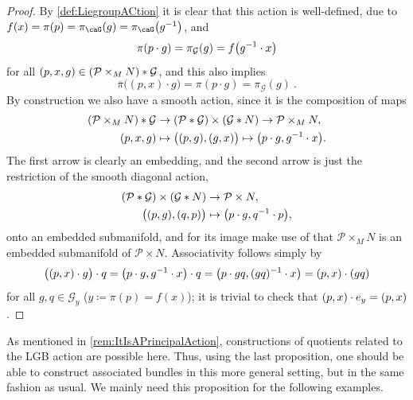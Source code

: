 \documentclass[reqno,a4paper,oneside]{amsart}
\theoremstyle{plain}
\theoremstyle{remark}
\theoremstyle{definition}
\begin{document}
\begin{proof}
\leavevmode\newline
By \ref{def:LiegroupACtion} it is clear that this action is well-defined, due to $f(x)= \pi(p) = \pi_\caG(g) = \pi_\caG\mleft(g^{-1}\mright)$, and
\begin{equation*}
\pi(p\cdot g) = \pi_{\mathcal{G}}(g) = f\mleft( g^{-1} \cdot x \mright)
\end{equation*}
for all $(p,x,g) \in \mleft(\mathcal{P} \times_M N\mright) * \mathcal{G}$,
and this also implies
\begin{equation*}
\overline{\pi}\bigl( (p, x) \cdot g \bigr)
=
\pi(p\cdot g)
=
\pi_{\mathcal{G}}(g)~.
\end{equation*}
By construction we also have a smooth action, since it is the composition of maps
\begin{align*}
\mleft(\mathcal{P} \times_M N\mright) * \mathcal{G} &\to (\mathcal{P} * \mathcal{G}) \times (\mathcal{G} * N) \to \mathcal{P} \times_M N,\\
(p, x, g) &\mapsto \bigl( (p, g), (g, x) \bigr) \mapsto \mleft( p \cdot g, g^{-1} \cdot x \mright).
\end{align*}
The first arrow is clearly an embedding, and the second arrow is just the restriction of the smooth diagonal action,
\begin{align*}
(\mathcal{P} * \mathcal{G}) \times (\mathcal{G} * N) &\to \mathcal{P} \times N,\\
\bigl( (p, g), (q, p) \bigr) &\mapsto \mleft( p \cdot g, q^{-1} \cdot p \mright),
\end{align*}
onto an embedded submanifold, and for its image make use of that $\mathcal{P} \times_M N$ is an embedded submanifold of $\mathcal{P} \times N$. Associativity follows simply by
\begin{equation*}
\bigl((p, x) \cdot g \bigr) \cdot q
=
\mleft( p \cdot g, g^{-1} \cdot x \mright) \cdot q
=
\mleft( p \cdot gq, (gq)^{-1} \cdot x \mright)
=
\mleft( p, x \mright) \cdot (gq)
\end{equation*}
for all $g, q \in \mathcal{G}_y$ ($y \coloneqq \pi(p) = f(x)$); it is trivial to check that $\mleft( p, x \mright) \cdot e_y = (p, x)$.
\end{proof}

As mentioned in \ref{rem:ItIsAPrincipalAction}, constructions of quotients related to the LGB action are possible here. Thus, using the last proposition, one should be able to construct associated bundles in this more general setting, but in the same fashion as usual. We mainly need this proposition for the following examples.
\end{document}
